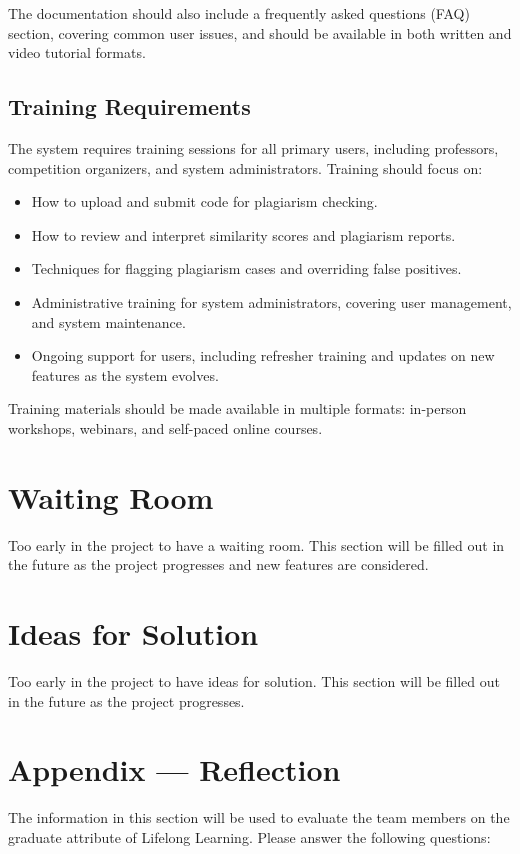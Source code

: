 \documentclass[12pt]{article}
\begin{document}
The documentation should also include a frequently asked questions (FAQ) section, covering common user issues, and should be available in both written and video tutorial formats.

\subsection{Training Requirements}
The system requires training sessions for all primary users, including professors, competition organizers, and system administrators. Training should focus on:
\begin{itemize}
    \item How to upload and submit code for plagiarism checking.
    \item How to review and interpret similarity scores and plagiarism reports.
    \item Techniques for flagging plagiarism cases and overriding false positives.
    \item Administrative training for system administrators, covering user management, and system maintenance.
    \item Ongoing support for users, including refresher training and updates on new features as the system evolves.
\end{itemize}

Training materials should be made available in multiple formats: in-person workshops, webinars, and self-paced online courses.


\section{Waiting Room}
Too early in the project to have a waiting room. This section will be filled out in the future as the project progresses and new features are considered.

\section{Ideas for Solution}
Too early in the project to have ideas for solution. This section will be filled out in the future as the project progresses.

\newpage{}
\section*{Appendix --- Reflection}

The information in this section will be used to evaluate the team members on the
graduate attribute of Lifelong Learning.  Please answer the following questions:
\end{document}
